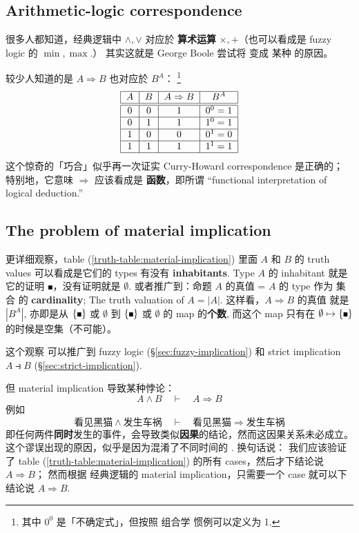 \subsection{Arithmetic-logic correspondence}

很多人都知道，经典逻辑中 $\wedge, \vee$ 对应於 \textbf{算术运算} $\times, +$（也可以看成是 fuzzy logic 的 $\min, \max$.） 其实这就是 George Boole 尝试将  变成 某种 的原因。

较少人知道的是 $A \Rightarrow B$ 也对应於 $B^A$： \footnote{其中 $0^0$ 是「不确定式」，但按照 组合学 惯例可以定义为 1.}
\begin{equation}
\label{truth-table:material-implication}
\begin{tabular}{|c|c|c|c|}
	\hline 
	$A$ & $B$ & $A \Rightarrow B$ & $B^A$ \\ 
	\hline \hline 
	0 & 0 & 1 & $0^0 = 1$ \\
	\hline 
	0 & 1 & 1 & $1^0 = 1$ \\ 
	\hline 
	1 & 0 & 0 & $0^1 = 0$ \\ 
	\hline 
	1 & 1 & 1 & $1^1 = 1$ \\ 
	\hline 
\end{tabular} 
\end{equation}
这个惊奇的「巧合」似乎再一次证实 Curry-Howard correspondence 是正确的； 特别地，它意味 $\Rightarrow$ 应该看成是 \textbf{函数}，即所谓 ``functional interpretation of logical deduction.'' 

\subsection{The problem of material implication}
\label{sec:material-implication}

更详细观察，table (\ref{truth-table:material-implication}) 里面 $A$ 和 $B$ 的 truth values 可以看成是它们的 types 有没有 \textbf{inhabitants}. Type $A$ 的 inhabitant 就是它的证明 $\witness$，没有证明就是 $\emptyset$.  或者推广到：命题 $A$ 的真值 = $A$ 的 type 作为 集合 的 \textbf{cardinality}; The truth valuation of $A = |A|$.  这样看，$A \Rightarrow B$ 的真值 就是 $|B^A|$, 亦即是从 $\{\witness\}$ 或 $\emptyset$ 到 $\{\witness\}$ 或 $\emptyset$ 的 map 的\textbf{个数}, 而这个 map 只有在 $\emptyset \mapsto \{\witness\}$ 的时候是空集（不可能）。

这个观察 可以推广到 fuzzy logic (\S\ref{sec:fuzzy-implication}) 和 strict implication $A \strictif B$ (\S\ref{sec:strict-implication}).

但 material implication 导致某种悖论：
\begin{equation}
A \wedge B \quad \vdash \quad A \Rightarrow B
\end{equation}
例如
\begin{equation}
\mbox{看见黑猫} \wedge \mbox{发生车祸} \quad \vdash \quad \mbox{看见黑猫} \Rightarrow \mbox{发生车祸}
\end{equation}
即任何两件\textbf{同时}发生的事件，会导致类似\textbf{因果}的结论，然而这因果关系未必成立。 这个谬误出现的原因，似乎是因为混淆了不同时间的 .  换句话说： 我们应该验证了 table (\ref{truth-table:material-implication}) 的所有 cases，然后才下结论说 $A \Rightarrow B$； 然而根据 经典逻辑的 material implication，只需要一个 case 就可以下结论说 $A \Rightarrow B$.

